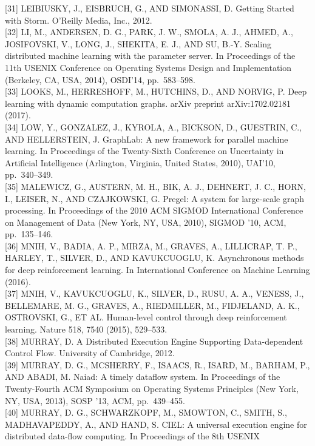 \documentclass[
]{article}
\begin{document}
{[}31{]} LEIBIUSKY, J., EISBRUCH, G., AND SIMONASSI, D. Getting Started
with Storm. O'Reilly Media, Inc., 2012.\\
{[}32{]} LI, M., ANDERSEN, D. G., PARK, J. W., SMOLA, A. J., AHMED, A.,
JOSIFOVSKI, V., LONG, J., SHEKITA, E. J., AND SU, B.-Y. Scaling
distributed machine learning with the parameter server. In Proceedings
of the 11th USENIX Conference on Operating Systems Design and
Implementation (Berkeley, CA, USA, 2014), OSDI'14, pp.~583--598.\\
{[}33{]} LOOKS, M., HERRESHOFF, M., HUTCHINS, D., AND NORVIG, P. Deep
learning with dynamic computation graphs. arXiv preprint
arXiv:1702.02181 (2017).\\
{[}34{]} LOW, Y., GONZALEZ, J., KYROLA, A., BICKSON, D., GUESTRIN, C.,
AND HELLERSTEIN, J. GraphLab: A new framework for parallel machine
learning. In Proceedings of the Twenty-Sixth Conference on Uncertainty
in Artificial Intelligence (Arlington, Virginia, United States, 2010),
UAI'10, pp.~340--349.\\
{[}35{]} MALEWICZ, G., AUSTERN, M. H., BIK, A. J., DEHNERT, J. C., HORN,
I., LEISER, N., AND CZAJKOWSKI, G. Pregel: A system for large-scale
graph processing. In Proceedings of the 2010 ACM SIGMOD International
Conference on Management of Data (New York, NY, USA, 2010), SIGMOD '10,
ACM, pp.~135--146.\\
{[}36{]} MNIH, V., BADIA, A. P., MIRZA, M., GRAVES, A., LILLICRAP, T.
P., HARLEY, T., SILVER, D., AND KAVUKCUOGLU, K. Asynchronous methods for
deep reinforcement learning. In International Conference on Machine
Learning (2016).\\
{[}37{]} MNIH, V., KAVUKCUOGLU, K., SILVER, D., RUSU, A. A., VENESS, J.,
BELLEMARE, M. G., GRAVES, A., RIEDMILLER, M., FIDJELAND, A. K.,
OSTROVSKI, G., ET AL. Human-level control through deep reinforcement
learning. Nature 518, 7540 (2015), 529--533.\\
{[}38{]} MURRAY, D. A Distributed Execution Engine Supporting
Data-dependent Control Flow. University of Cambridge, 2012.\\
{[}39{]} MURRAY, D. G., MCSHERRY, F., ISAACS, R., ISARD, M., BARHAM, P.,
AND ABADI, M. Naiad: A timely dataflow system. In Proceedings of the
Twenty-Fourth ACM Symposium on Operating Systems Principles (New York,
NY, USA, 2013), SOSP '13, ACM, pp.~439--455.\\
{[}40{]} MURRAY, D. G., SCHWARZKOPF, M., SMOWTON, C., SMITH, S.,
MADHAVAPEDDY, A., AND HAND, S. CIEL: A universal execution engine for
distributed data-flow computing. In Proceedings of the 8th USENIX
\end{document}
